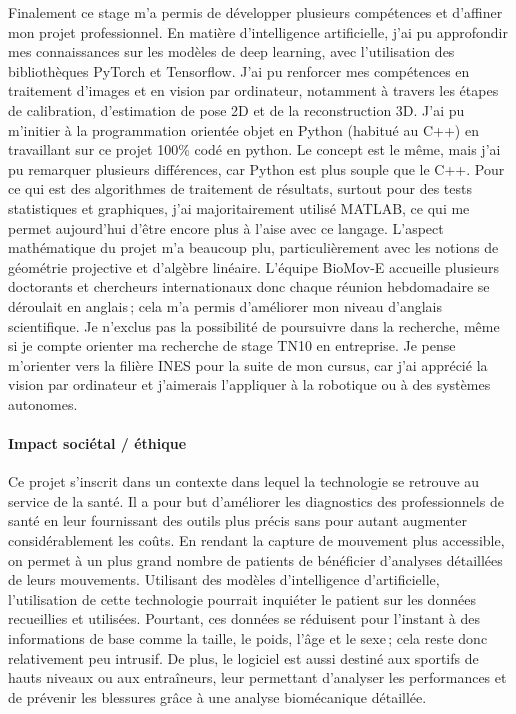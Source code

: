         Finalement ce stage m'a permis de développer plusieurs compétences et d'affiner mon projet professionnel. En matière d'intelligence artificielle, j'ai pu approfondir mes connaissances sur les modèles de deep learning, avec l'utilisation des bibliothèques PyTorch et Tensorflow.
        J'ai pu renforcer mes compétences en traitement d'images et en vision par ordinateur, notamment à travers les étapes de calibration, d'estimation de pose 2D et de la reconstruction 3D. J'ai pu m'initier à la programmation orientée objet en Python (habitué au C++) en travaillant sur ce projet 100\% codé en python. Le concept est le même, mais j'ai pu remarquer plusieurs différences, car Python est plus souple que le C++. Pour ce qui est des algorithmes de traitement de résultats, surtout pour des tests statistiques et graphiques, j'ai majoritairement utilisé MATLAB, ce qui me permet aujourd'hui d'être encore plus à l'aise avec ce langage. L'aspect mathématique du projet m'a beaucoup plu, particulièrement avec les notions de géométrie projective et d'algèbre linéaire. L'équipe BioMov-E accueille plusieurs doctorants et chercheurs internationaux donc chaque réunion hebdomadaire se déroulait en anglais ; cela m'a permis d'améliorer mon niveau d'anglais scientifique. 
        Je n'exclus pas la possibilité de poursuivre dans la recherche, même si je compte orienter ma recherche de stage TN10 en entreprise. Je pense m'orienter vers la filière INES pour la suite de mon cursus, car j'ai apprécié la vision par ordinateur et j'aimerais l'appliquer à la robotique ou à des systèmes autonomes.


    \paragraph{Impact sociétal / éthique}

        Ce projet s'inscrit dans un contexte dans lequel la technologie se retrouve au service de la santé. Il a pour but d'améliorer les diagnostics des professionnels de santé en leur fournissant des outils plus précis sans pour autant augmenter considérablement les coûts. En rendant la capture de mouvement plus accessible, on permet à un plus grand nombre de patients de bénéficier d'analyses détaillées de leurs mouvements. Utilisant des modèles d'intelligence d'artificielle, l'utilisation de cette technologie pourrait inquiéter le patient sur les données recueillies et utilisées. Pourtant, ces données se réduisent pour l'instant à des informations de base comme la taille, le poids, l'âge et le sexe ; cela reste donc relativement peu intrusif. De plus, le logiciel est aussi destiné aux sportifs de hauts niveaux ou aux entraîneurs, leur permettant d'analyser les performances et de prévenir les blessures grâce à une analyse biomécanique détaillée.

